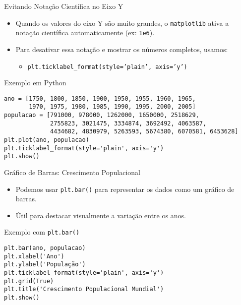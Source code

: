 \begin{frame}[fragile]{Evitando Notação Científica no Eixo Y}
    \begin{itemize}
        \item Quando os valores do eixo Y são muito grandes, o \texttt{matplotlib} ativa a notação científica automaticamente (ex: \texttt{1e6}).
        \item Para desativar essa notação e mostrar os números completos, usamos:
              \begin{itemize}
                  \item \texttt{plt.ticklabel\_format(style='plain', axis='y')}
              \end{itemize}

    \end{itemize}

    \begin{block}{Exemplo em Python}
        \begin{verbatim}
ano = [1750, 1800, 1850, 1900, 1950, 1955, 1960, 1965,
       1970, 1975, 1980, 1985, 1990, 1995, 2000, 2005]
populacao = [791000, 978000, 1262000, 1650000, 2518629,
             2755823, 3021475, 3334874, 3692492, 4063587,
             4434682, 4830979, 5263593, 5674380, 6070581, 6453628]
plt.plot(ano, populacao)
plt.ticklabel_format(style='plain', axis='y')  
plt.show()
\end{verbatim}
    \end{block}
\end{frame}



\begin{frame}[fragile]{Gráfico de Barras: Crescimento Populacional}
    \begin{itemize}
        \item Podemos usar \texttt{plt.bar()} para representar os dados como um gráfico de barras.
        \item Útil para destacar visualmente a variação entre os anos.
    \end{itemize}

    \begin{block}{Exemplo com \texttt{plt.bar()}}
        \begin{verbatim}
plt.bar(ano, populacao)
plt.xlabel('Ano')
plt.ylabel('População')
plt.ticklabel_format(style='plain', axis='y')
plt.grid(True)
plt.title('Crescimento Populacional Mundial')
plt.show()
\end{verbatim}
    \end{block}
\end{frame}

